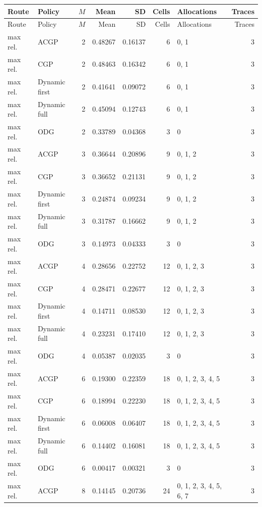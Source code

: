 \documentclass[10pt,a4paper]{article}
\begin{document}
\tiny\setlength{\tabcolsep}{2pt}\begin{longtable}{@{}p{23mm}p{29mm}rrrrp{36mm}r@{}}
\toprule Route & Policy & $M$ & Mean & SD & Cells & Allocations & Traces \\ \midrule\endfirsthead
\toprule Route & Policy & $M$ & Mean & SD & Cells & Allocations & Traces \\ \midrule\endhead
\bottomrule\endfoot
max rel. & ACGP & 2 & 0.48267 & 0.16137 & 6 & 0, 1 & 3 \\
max rel. & CGP & 2 & 0.48463 & 0.16342 & 6 & 0, 1 & 3 \\
max rel. & Dynamic first & 2 & 0.41641 & 0.09072 & 6 & 0, 1 & 3 \\
max rel. & Dynamic full & 2 & 0.45094 & 0.12743 & 6 & 0, 1 & 3 \\
max rel. & ODG & 2 & 0.33789 & 0.04368 & 3 & 0 & 3 \\
max rel. & ACGP & 3 & 0.36644 & 0.20896 & 9 & 0, 1, 2 & 3 \\
max rel. & CGP & 3 & 0.36652 & 0.21131 & 9 & 0, 1, 2 & 3 \\
max rel. & Dynamic first & 3 & 0.24874 & 0.09234 & 9 & 0, 1, 2 & 3 \\
max rel. & Dynamic full & 3 & 0.31787 & 0.16662 & 9 & 0, 1, 2 & 3 \\
max rel. & ODG & 3 & 0.14973 & 0.04333 & 3 & 0 & 3 \\
max rel. & ACGP & 4 & 0.28656 & 0.22752 & 12 & 0, 1, 2, 3 & 3 \\
max rel. & CGP & 4 & 0.28471 & 0.22677 & 12 & 0, 1, 2, 3 & 3 \\
max rel. & Dynamic first & 4 & 0.14711 & 0.08530 & 12 & 0, 1, 2, 3 & 3 \\
max rel. & Dynamic full & 4 & 0.23231 & 0.17410 & 12 & 0, 1, 2, 3 & 3 \\
max rel. & ODG & 4 & 0.05387 & 0.02035 & 3 & 0 & 3 \\
max rel. & ACGP & 6 & 0.19300 & 0.22359 & 18 & 0, 1, 2, 3, 4, 5 & 3 \\
max rel. & CGP & 6 & 0.18994 & 0.22230 & 18 & 0, 1, 2, 3, 4, 5 & 3 \\
max rel. & Dynamic first & 6 & 0.06008 & 0.06407 & 18 & 0, 1, 2, 3, 4, 5 & 3 \\
max rel. & Dynamic full & 6 & 0.14402 & 0.16081 & 18 & 0, 1, 2, 3, 4, 5 & 3 \\
max rel. & ODG & 6 & 0.00417 & 0.00321 & 3 & 0 & 3 \\
max rel. & ACGP & 8 & 0.14145 & 0.20736 & 24 & 0, 1, 2, 3, 4, 5, 6, 7 & 3 \\

\end{longtable}
\end{document}
